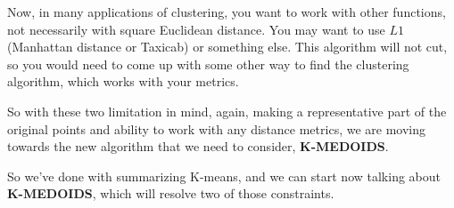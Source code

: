 \documentclass[a4paper, 12pt]{article}
\begin{document}
Now, in many applications of clustering, you want to work with other functions,
not necessarily with square Euclidean distance. You may want to use \(L1\)
(Manhattan distance or Taxicab) or something else. This algorithm will not cut,
so you would need to come up with some other way to find the clustering
algorithm, which works with your metrics.

So with these two limitation in mind, again, making a representative part of the
original points and ability to work with any distance metrics, we are moving
towards the new algorithm that we need to consider, \textbf{K-MEDOIDS}.

So we've done with summarizing K-means, and we can start now talking about
\textbf{K-MEDOIDS}, which will resolve two of those constraints.
\end{document}
